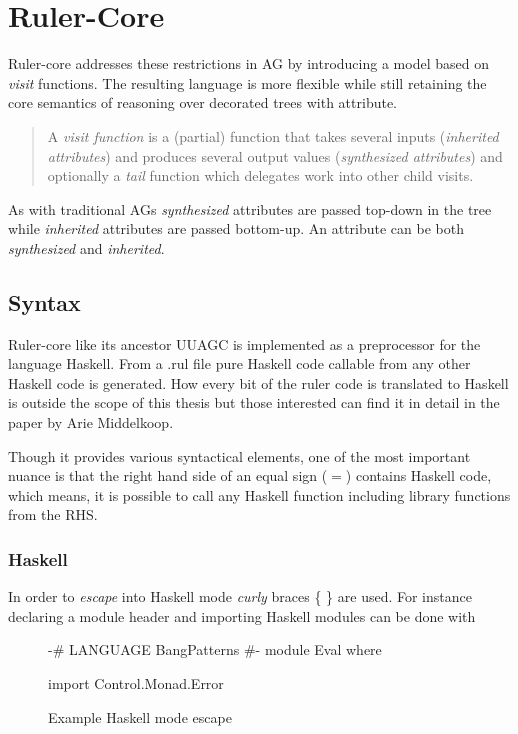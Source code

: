 \section{Ruler-Core}
Ruler-core addresses these restrictions in AG by introducing a model based on \emph{visit}\cite{visits} functions. The resulting language is more flexible while still retaining the core semantics of reasoning over decorated trees with attribute.

\begin{quotation}
A \emph{visit function}\cite{visitag} is a (partial) function that takes several inputs (\emph{inherited attributes}) and produces several output values (\emph{synthesized attributes}) and optionally a \emph{tail} function which delegates work into other child visits.
\end{quotation}

As with traditional AGs \emph{synthesized} attributes are passed top-down in the tree while \emph{inherited} attributes are passed bottom-up. An attribute can be both \emph{synthesized} and \emph{inherited}.

\subsection{Syntax}
Ruler-core like its ancestor UUAGC is implemented as a preprocessor for the language Haskell. From a .rul file pure Haskell code callable from any other Haskell code is generated. How every bit of the ruler code is translated to Haskell is outside the scope of this thesis but those interested can find it in detail in the paper by Arie Middelkoop\cite{visitag}.

Though it provides various syntactical elements, one of the most important nuance is that the right hand side of an equal sign ($=$) contains Haskell code, which means, it is possible to call any Haskell function including library functions from the RHS. 

\subsubsection{Haskell}
In order to \emph{escape} into Haskell mode \emph{curly} braces \{ \} are used. For instance declaring a module header and importing Haskell modules can be done with

\begin{figure}[!h]
\begin{code}
{
{-# LANGUAGE BangPatterns #-}
module Eval where

import Control.Monad.Error
}
\end{code}
\caption{Example Haskell mode escape}
\end{figure}

